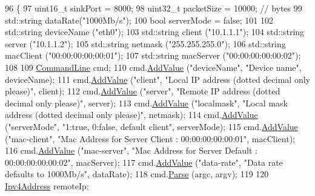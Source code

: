 \begin{DoxyCode}
96 \{
97   uint16\_t sinkPort = 8000;
98   uint32\_t packetSize = 10000; \textcolor{comment}{// bytes}
99   std::string dataRate(\textcolor{stringliteral}{"1000Mb/s"});
100   \textcolor{keywordtype}{bool} serverMode = \textcolor{keyword}{false};
101 
102   std::string deviceName (\textcolor{stringliteral}{"eth0"});
103   std::string client (\textcolor{stringliteral}{"10.1.1.1"});
104   std::string server (\textcolor{stringliteral}{"10.1.1.2"});
105   std::string netmask (\textcolor{stringliteral}{"255.255.255.0"});
106   std::string macClient (\textcolor{stringliteral}{"00:00:00:00:00:01"});
107   std::string macServer (\textcolor{stringliteral}{"00:00:00:00:00:02"});
108 
109   \hyperlink{classns3_1_1CommandLine}{CommandLine} cmd;
110   cmd.\hyperlink{classns3_1_1CommandLine_addcfb546c7ad4c8bd0965654d55beb8e}{AddValue} (\textcolor{stringliteral}{"deviceName"}, \textcolor{stringliteral}{"Device name"}, deviceName);
111   cmd.\hyperlink{classns3_1_1CommandLine_addcfb546c7ad4c8bd0965654d55beb8e}{AddValue} (\textcolor{stringliteral}{"client"}, \textcolor{stringliteral}{"Local IP address (dotted decimal only please)"}, client);
112   cmd.\hyperlink{classns3_1_1CommandLine_addcfb546c7ad4c8bd0965654d55beb8e}{AddValue} (\textcolor{stringliteral}{"server"}, \textcolor{stringliteral}{"Remote IP address (dotted decimal only please)"}, server);
113   cmd.\hyperlink{classns3_1_1CommandLine_addcfb546c7ad4c8bd0965654d55beb8e}{AddValue} (\textcolor{stringliteral}{"localmask"}, \textcolor{stringliteral}{"Local mask address (dotted decimal only please)"}, netmask);
114   cmd.\hyperlink{classns3_1_1CommandLine_addcfb546c7ad4c8bd0965654d55beb8e}{AddValue} (\textcolor{stringliteral}{"serverMode"}, \textcolor{stringliteral}{"1:true, 0:false, default client"}, serverMode);
115   cmd.\hyperlink{classns3_1_1CommandLine_addcfb546c7ad4c8bd0965654d55beb8e}{AddValue} (\textcolor{stringliteral}{"mac-client"}, \textcolor{stringliteral}{"Mac Address for Server Client : 00:00:00:00:00:01"}, macClient);
116   cmd.\hyperlink{classns3_1_1CommandLine_addcfb546c7ad4c8bd0965654d55beb8e}{AddValue} (\textcolor{stringliteral}{"mac-server"}, \textcolor{stringliteral}{"Mac Address for Server Default : 00:00:00:00:00:02"}, macServer);
117   cmd.\hyperlink{classns3_1_1CommandLine_addcfb546c7ad4c8bd0965654d55beb8e}{AddValue} (\textcolor{stringliteral}{"data-rate"}, \textcolor{stringliteral}{"Data rate defaults to 1000Mb/s"}, dataRate);
118   cmd.\hyperlink{classns3_1_1CommandLine_a5c10b85b3207e5ecb48d907966923156}{Parse} (argc, argv);
119 
120   \hyperlink{classns3_1_1Ipv4Address}{Ipv4Address} remoteIp;

\end{DoxyCode}
